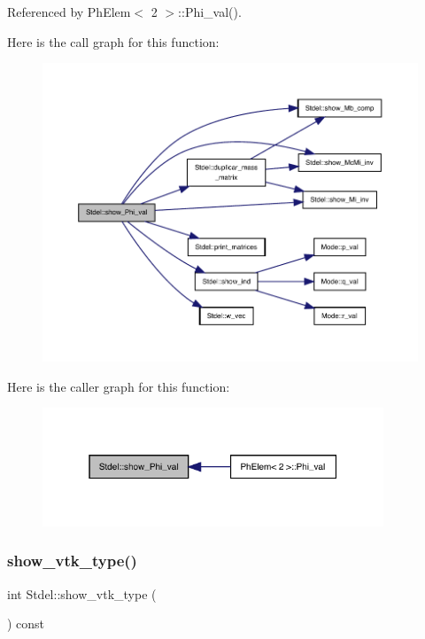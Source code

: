 Referenced by Ph\+Elem$<$ 2 $>$\+::\+Phi\+\_\+val().

Here is the call graph for this function\+:
\nopagebreak
\begin{figure}[H]
\begin{center}
\leavevmode
\includegraphics[width=350pt]{classStdel_a6565c36150823a1f52a2daf05806f7a4_cgraph}
\end{center}
\end{figure}
Here is the caller graph for this function\+:
\nopagebreak
\begin{figure}[H]
\begin{center}
\leavevmode
\includegraphics[width=289pt]{classStdel_a6565c36150823a1f52a2daf05806f7a4_icgraph}
\end{center}
\end{figure}
\mbox{\label{classStdel_a56288a857b95a55c8b7eb5b473e836d9}} 
\subsubsection{\texorpdfstring{show\+\_\+vtk\+\_\+type()}{show\_vtk\_type()}}
{\footnotesize\ttfamily int Stdel\+::show\+\_\+vtk\+\_\+type (\begin{DoxyParamCaption}{ }\end{DoxyParamCaption}) const\hspace{0.3cm}{\ttfamily [inline]}}



